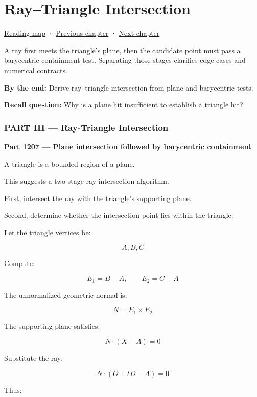 \hypertarget{04-visual-computing-ii-ch024}{}
\chapter{Ray--Triangle Intersection}\label{04-visual-computing-ii-ch024-raytriangle-intersection}

\hyperref[volume-reading-map]{Reading map} · \hyperref[04-visual-computing-ii-ch023-mesh-topology-and-connectivity]{Previous chapter} · \hyperref[04-visual-computing-ii-ch025-sat-for-triangle-and-convex-polygon-tests]{Next chapter}

A ray first meets the triangle's plane, then the candidate point must pass a barycentric containment test. Separating those stages clarifies edge cases and numerical contracts.

\textbf{By the end:} Derive ray--triangle intersection from plane and barycentric tests.

\textbf{Recall question:} Why is a plane hit insufficient to establish a triangle hit?

\subsection{PART III --- Ray-Triangle Intersection}\label{04-visual-computing-ii-ch024-part-iii-ray-triangle-intersection}

\textbf{Part 1207 --- Plane intersection followed by barycentric containment}

A triangle is a bounded region of a plane.

This suggests a two-stage ray intersection algorithm.

First, intersect the ray with the triangle's supporting plane.

Second, determine whether the intersection point lies within the triangle.

Let the triangle vertices be:

\[
A,B,C
\]

Compute:

\[
E_1=B-A,\qquad E_2=C-A
\]

The unnormalized geometric normal is:

\[
N=E_1\times E_2
\]

The supporting plane satisfies:

\[
N\cdot(X-A)=0
\]

Substitute the ray:

\[
N\cdot(O+tD-A)=0
\]

Thus:

